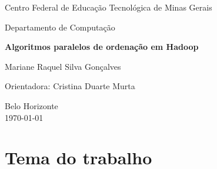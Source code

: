 \documentclass[a4paper,12pt]{article}
\begin{document}


\begin{titlepage}

  \vfill

  \begin{center}
    \begin{large}
      Centro Federal de Educação Tecnológica de Minas Gerais
    \end{large}
  \end{center}

  \begin{center}
    \begin{large}
      Departamento de Computação
    \end{large}
  \end{center}

  \vfill

  \begin{center}
    \begin{Large}
      \textbf{Algoritmos paralelos de ordenação em Hadoop} \\[1.4cm]            
    \end{Large}
  \end{center}


  \vfill

  \begin{center}
    \begin{large}
      Mariane Raquel Silva Gonçalves	
    \end{large}
  \end{center}

  \begin{center}
    \begin{large}
      Orientadora: Cristina Duarte Murta
    \end{large}
  \end{center}

  \vfill

  \begin{center}
    \begin{large}
      Belo Horizonte \\
      \today \\
    \end{large}
  \end{center}

\clearpage
\tableofcontents 
\end{titlepage}


\section{Tema do trabalho}
\end{document}

